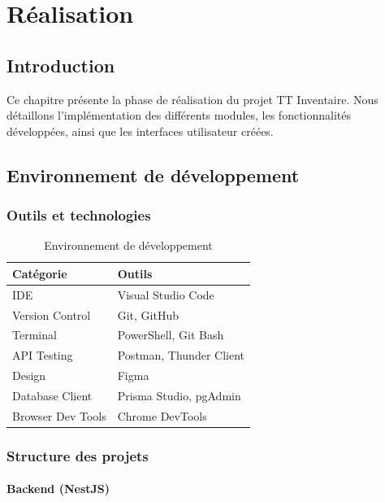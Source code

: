 
\chapter{Réalisation}

\section{Introduction}

Ce chapitre présente la phase de réalisation du projet TT Inventaire. Nous détaillons l'implémentation des différents modules, les fonctionnalités développées, ainsi que les interfaces utilisateur créées.

\section{Environnement de développement}

\subsection{Outils et technologies}

\begin{table}[H]
\centering
\caption{Environnement de développement}
\begin{tabularx}{\textwidth}{|l|X|}
\hline
\textbf{Catégorie} & \textbf{Outils} \\
\hline
IDE & Visual Studio Code \\
\hline
Version Control & Git, GitHub \\
\hline
Terminal & PowerShell, Git Bash \\
\hline
API Testing & Postman, Thunder Client \\
\hline
Design & Figma \\
\hline
Database Client & Prisma Studio, pgAdmin \\
\hline
Browser Dev Tools & Chrome DevTools \\
\hline
\end{tabularx}
\end{table}

\subsection{Structure des projets}

\subsubsection{Backend (NestJS)}

